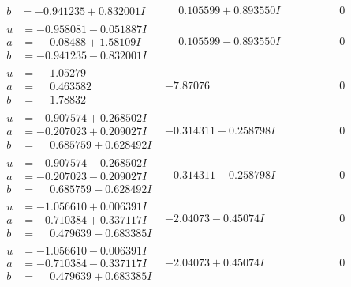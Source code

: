 \documentclass[1p]{elsarticle_modified}
\theoremstyle{definition}
\begin{document}
$$\begin{array}{c|c|c}
\begin{aligned}
b &= -0.941235 + 0.832001 I\end{aligned}
 & \phantom{-}0.105599 + 0.893550 I & \phantom{-0.000000 } 0 \\ \hline\begin{aligned}
u &= -0.958081 - 0.051887 I \\
a &= \phantom{-}0.08488 + 1.58109 I \\
b &= -0.941235 - 0.832001 I\end{aligned}
 & \phantom{-}0.105599 - 0.893550 I & \phantom{-0.000000 } 0 \\ \hline\begin{aligned}
u &= \phantom{-}1.05279\phantom{ +0.000000I} \\
a &= \phantom{-}0.463582\phantom{ +0.000000I} \\
b &= \phantom{-}1.78832\phantom{ +0.000000I}\end{aligned}
 & -7.87076\phantom{ +0.000000I} & \phantom{-0.000000 } 0 \\ \hline\begin{aligned}
u &= -0.907574 + 0.268502 I \\
a &= -0.207023 + 0.209027 I \\
b &= \phantom{-}0.685759 + 0.628492 I\end{aligned}
 & -0.314311 + 0.258798 I & \phantom{-0.000000 } 0 \\ \hline\begin{aligned}
u &= -0.907574 - 0.268502 I \\
a &= -0.207023 - 0.209027 I \\
b &= \phantom{-}0.685759 - 0.628492 I\end{aligned}
 & -0.314311 - 0.258798 I & \phantom{-0.000000 } 0 \\ \hline\begin{aligned}
u &= -1.056610 + 0.006391 I \\
a &= -0.710384 + 0.337117 I \\
b &= \phantom{-}0.479639 - 0.683385 I\end{aligned}
 & -2.04073 - 0.45074 I & \phantom{-0.000000 } 0 \\ \hline\begin{aligned}
u &= -1.056610 - 0.006391 I \\
a &= -0.710384 - 0.337117 I \\
b &= \phantom{-}0.479639 + 0.683385 I\end{aligned}
 & -2.04073 + 0.45074 I & \phantom{-0.000000 } 0 \\ \hline\begin{aligned}

\end{aligned}
\end{array}$$
\end{document}
